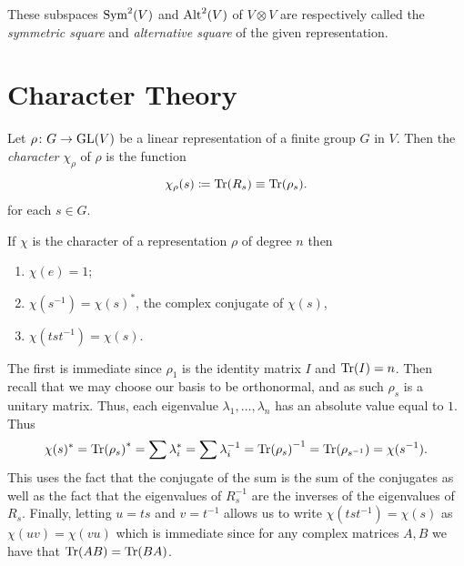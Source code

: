 \documentclass[letterpaper, 11pt, oneside]{book}
\begin{document}
\begin{defn}\label{defn:sym_alt_square}
  These subspaces $\operatorname{Sym}^{2}(V)$ and $\operatorname{Alt}^{2}(V)$ of $V \otimes V$ are respectively called the \emph{symmetric square} and \emph{alternative square} of the given representation.
\end{defn}

\chapter{Character Theory}

\begin{defn}[Character]
  Let $\rho\colon G \to \operatorname{GL}(V)$ be a linear representation of a finite group $G$ in $V$.
  Then the \emph{character} $\chi_{\rho}$ of $\rho$ is the function
  \[
    \chi_{\rho}(s) \coloneqq \Tr(R_{s}) \equiv \Tr(\rho_{s}).
  \]
  for each $s \in G$.
\end{defn}

\begin{prop}\label{prop:character_basic_props}
  If $\chi$ is the character of a representation $\rho$ of degree $n$ then
  \begin{enumerate}
  \item $\chi(e) = 1$;
  \item $\chi(s^{-1}) = \chi(s)^{*}$, the complex conjugate of $\chi(s)$,
  \item $\chi(tst^{-1}) = \chi(s)$.
  \end{enumerate}
\end{prop}
\begin{pf}
  The first is immediate since $\rho_{1}$ is the identity matrix $I$ and $\Tr(I) = n$.
  Then recall that we may choose our basis to be orthonormal, and as such $\rho_{s}$ is a unitary matrix.
  Thus, each eigenvalue $\lambda_{1}, \ldots, \lambda_{n}$ has an absolute value equal to $1$.
  Thus
  \[
    \chi(s)^{*} = \Tr(\rho_{s})^{*} = \sum \lambda_{i}^{*} = \sum \lambda_{i}^{-1} = \Tr(\rho_{s})^{-1} = \Tr(\rho_{s^{-1}}) = \chi(s^{-1}).
  \]
  This uses the fact that the conjugate of the sum is the sum of the conjugates as well as the fact that the eigenvalues of $R_{s}^{-1}$ are the inverses of the eigenvalues of $R_{s}$.
  Finally, letting $u = ts$ and $v = t^{-1}$ allows us to write $\chi(tst^{-1}) = \chi(s)$ as $\chi(uv) = \chi(vu)$ which is immediate since for any complex matrices $A, B$ we have that $\Tr(AB) = \Tr(BA)$.
\end{pf}

\clearpage
\end{document}
